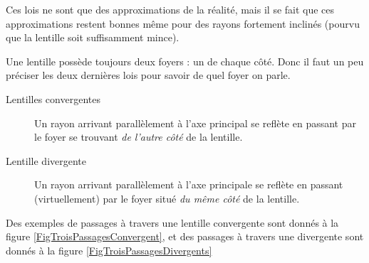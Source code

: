 \documentclass[a4paper,12pt]{book}
\theoremstyle{mes_exemples}	\newtheorem{exemple}[numtho]{Exemple}
\theoremstyle{mes_tho}
\begin{document}
Ces lois ne sont que des approximations de la réalité, mais il se fait que ces approximations restent bonnes même pour des rayons fortement inclinés (pourvu que la lentille soit suffisamment mince).

\label{PgRemarqueFoyer}Une lentille possède toujours deux foyers : un de chaque côté. Donc il faut un peu préciser les deux dernières lois pour savoir de quel foyer on parle.
\begin{description}
\item[Lentilles convergentes] Un rayon arrivant parallèlement à l'axe principal se reflète en passant par le foyer se trouvant \emph{de l'autre côté} de la lentille.
\item[Lentille divergente] Un rayon arrivant parallèlement à l'axe principale se reflète en passant (virtuellement) par le foyer situé \emph{du même côté} de la lentille.
\end{description}
Des exemples de passages à travers une lentille convergente sont donnés à la figure \ref{FigTroisPassagesConvergent}, et des passages à travers une divergente sont donnés à la figure \ref{FigTroisPassagesDivergents}
\end{document}
